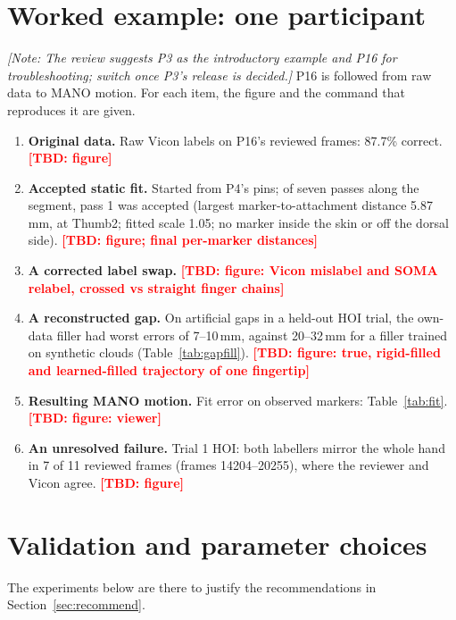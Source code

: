 \documentclass[11pt,a4paper]{article}
\newcommand{\tbd}[1]{\textcolor{red}{\textbf{[TBD: #1]}}}
\newcommand{\note}[1]{\textcolor{orange!80!black}{\textit{[Note: #1]}}}
\begin{document}
\section{Worked example: one participant}\label{sec:example}
\note{The review suggests P3 as the introductory example and P16 for troubleshooting; switch once P3's release is
decided.} P16 is followed from raw data to MANO motion. For each item, the figure and the command that reproduces it are given.
\begin{enumerate}[nosep]
  \item \textbf{Original data.} Raw Vicon labels on P16's reviewed frames: 87.7\% correct. \tbd{figure}
  \item \textbf{Accepted static fit.} Started from P4's pins; of seven passes along the segment, pass 1 was accepted (largest marker-to-attachment
distance 5.87\,mm, at Thumb2; fitted scale 1.05; no marker inside the skin or off the dorsal side).
  \tbd{figure; final per-marker distances}
  \item \textbf{A corrected label swap.} \tbd{figure: Vicon mislabel and SOMA relabel, crossed vs straight finger chains}
  \item \textbf{A reconstructed gap.} On artificial gaps in a held-out HOI trial, the own-data filler had worst errors
  of 7--10\,mm, against 20--32\,mm for a filler trained on synthetic clouds (Table~\ref{tab:gapfill}). \tbd{figure:
  true, rigid-filled and learned-filled trajectory of one fingertip}
  \item \textbf{Resulting MANO motion.} Fit error on observed markers: Table~\ref{tab:fit}. \tbd{figure: viewer}
  \item \textbf{An unresolved failure.} Trial 1 HOI: both labellers mirror the whole hand in 7 of 11 reviewed frames
  (frames 14204--20255), where the reviewer and Vicon agree. \tbd{figure}
\end{enumerate}

\section{Validation and parameter choices}\label{sec:validation}
The experiments below are there to justify the recommendations in Section~\ref{sec:recommend}.
\end{document}
